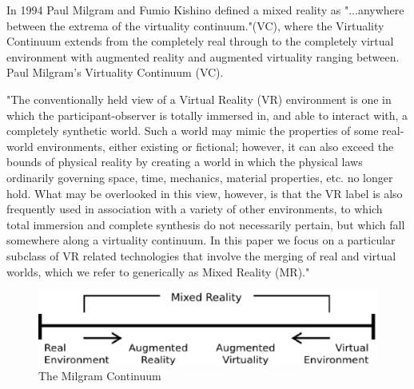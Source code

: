 In 1994 Paul Milgram and Fumio Kishino\cite{Milgram94} defined a mixed reality as "...anywhere between the extrema of the virtuality continuum."(VC), where the Virtuality Continuum extends from the completely real through to the completely virtual environment with augmented reality and augmented virtuality ranging between.
Paul Milgram's Virtuality Continuum (VC).

"The conventionally held view of a Virtual Reality (VR) environment is one in which the participant-observer is totally immersed in, and able to interact with, a completely synthetic world. Such a world may mimic the properties of some real-world environments, either existing or fictional; however, it can also exceed the bounds of physical reality by creating a world in which the physical laws ordinarily governing space, time, mechanics, material properties, etc. no longer hold. What may be overlooked in this view, however, is that the VR label is also frequently used in association with a variety of other environments, to which total immersion and complete synthesis do not necessarily pertain, but which fall somewhere along a virtuality continuum. In this paper we focus on a particular subclass of VR related technologies that involve the merging of real and virtual worlds, which we refer to generically as Mixed Reality (MR)."

\begin{figure}
\centering
\includegraphics[bb=0 0 420 90,scale=0.8]{Millee.ps}
\caption{The Milgram Continuum}
\end{figure}


